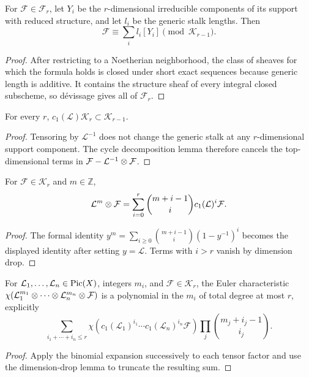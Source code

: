 \begin{lemma}\label{kps-lem-cycle-decomposition}
For $\mathcal F\in\mathcal F_r$, let $Y_i$ be the $r$-dimensional
irreducible components of its support with reduced structure, and let $l_i$
be the generic stalk lengths. Then
\[
 \mathcal F\equiv\sum_i l_i[Y_i]\pmod{\mathcal K_{r-1}}.
\]
\end{lemma}
\begin{proof}
After restricting to a Noetherian neighborhood, the class of sheaves for
which the formula holds is closed under short exact sequences because generic
length is additive. It contains the structure sheaf of every integral closed
subscheme, so dévissage gives all of $\mathcal F_r$.
\end{proof}

\begin{lemma}\label{kps-lem-dimension-drop}
For every $r$, $c_1(\mathcal L)\mathcal K_r\subset\mathcal K_{r-1}$.
\end{lemma}
\begin{proof}
Tensoring by $\mathcal L^{-1}$ does not change the generic stalk at any
$r$-dimensional support component. The cycle decomposition lemma therefore
cancels the top-dimensional terms in
$\mathcal F-\mathcal L^{-1}\otimes\mathcal F$.
\end{proof}

\begin{lemma}\label{kps-lem-binomial-expansion}
For $\mathcal F\in\mathcal K_r$ and $m\in\mathbb Z$,
\[
 \mathcal L^m\otimes\mathcal F=
 \sum_{i=0}^r\binom{m+i-1}{i}c_1(\mathcal L)^i\mathcal F.
\]
\end{lemma}
\begin{proof}
The formal identity
$y^m=\sum_{i\ge0}\binom{m+i-1}{i}(1-y^{-1})^i$ becomes the displayed
identity after setting $y=\mathcal L$. Terms with $i>r$ vanish by dimension
drop.
\end{proof}

\begin{theorem}\label{kps-thm-snapper}
For $\mathcal L_1,\ldots,\mathcal L_n\in\operatorname{Pic}(X)$, integers $m_i$, and
$\mathcal F\in\mathcal K_r$, the Euler characteristic
$\chi(\mathcal L_1^{m_1}\otimes\cdots\otimes\mathcal L_n^{m_n}\otimes\mathcal F)$
is a polynomial in the $m_i$ of total degree at most $r$, explicitly
\[
 \sum_{i_1+\cdots+i_n\le r}\chi(c_1(\mathcal L_1)^{i_1}\cdots
 c_1(\mathcal L_n)^{i_n}\mathcal F)
 \prod_j\binom{m_j+i_j-1}{i_j}.
\]
\end{theorem}
\begin{proof}
Apply the binomial expansion successively to each tensor factor and use the
dimension-drop lemma to truncate the resulting sum.
\end{proof}

